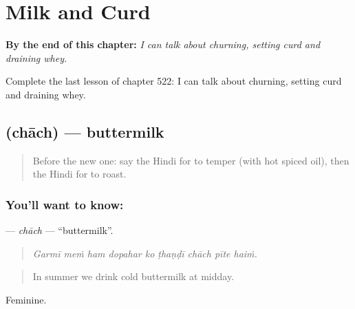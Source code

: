 
\chapter{Milk and Curd}
\label{ch:hi-milk-and-curd}

\begin{chapteropening}
\textbf{By the end of this chapter:} \emph{I can talk about churning, setting curd and draining whey.}

Complete the last lesson of chapter 522: I can talk about churning, setting curd and draining whey.
\end{chapteropening}

\section[\texorpdfstring{\hi{छाछ} (chāch)}{छाछ (chāch)}]{ (chāch) — buttermilk}

\label{lesson:HI-C522-chach}



\begin{quote}
Before the new one: say the Hindi for to temper (with hot spiced oil), then the Hindi for to roast.
\end{quote}

\subsection*{You'll want to know: }
\textbf{} — \emph{chāch} — \textquotedblleft{}buttermilk\textquotedblright{}.

\begin{quote}
        
\end{quote}

\begin{quote}
\emph{Garmī meṁ ham dopahar ko ṭhaṇḍī chāch pīte haiṁ.}
\end{quote}

\begin{quote}
In summer we drink cold buttermilk at midday.
\end{quote}

Feminine.

